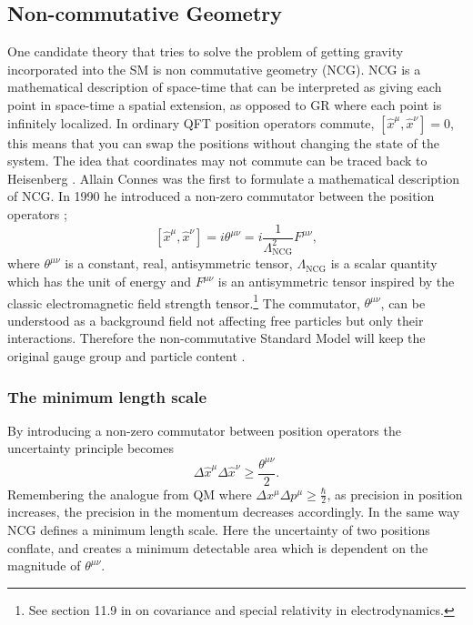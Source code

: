 \subsection{Non-commutative Geometry}
One candidate theory that tries to solve the problem of getting gravity incorporated into the SM is non commutative geometry (NCG). NCG is a mathematical description of space-time that can be interpreted as giving each point in space-time a spatial extension, as opposed to GR where each point is infinitely localized. In ordinary QFT position operators commute, $[ \hat x^{\mu}, \hat x^{\nu}] = 0$, this means that you can swap the positions without changing the state of the system. The idea that coordinates may not commute can be traced back to Heisenberg \cite{snyder1947qst}. Allain Connes \cite{connes1991pma} was the first to formulate a mathematical description of NCG. In 1990 he introduced a non-zero commutator between the position operators \cite{rosendahl2008};
\begin{equation} \label{eq:ncgtheta}
	[ \hat x^{\mu}, \hat x^{\nu}] = i \theta^{\mu \nu} = i \frac{1}{\Lambda_{\textrm{NCG}}^2} F^{\mu\nu},
\end{equation}
where $\theta^{\mu \nu}$ is a constant, real, antisymmetric tensor, $\Lambda_{\textrm{NCG}}$ is a scalar quantity which has the unit of energy and $F^{\mu\nu}$ is an antisymmetric tensor inspired by the classic electromagnetic field strength tensor.\footnote{See section 11.9 in \cite{jackson1975cew} on covariance and special relativity in electrodynamics.} The commutator, $\theta^{\mu \nu}$, can be understood as a background field not affecting free particles but only their interactions. Therefore the non-commutative Standard Model will keep the original gauge group and particle content \cite{rosendahl2008}.

\subsubsection{The minimum length scale}
By introducing a non-zero commutator between position operators the uncertainty principle becomes
\begin{equation}
\Delta \hat x^{\mu} \Delta \hat x^{\nu} \ge \frac{\theta^{\mu \nu}}{2}.
\end{equation}
Remembering the analogue from QM where $\Delta x^{\mu} \Delta p^{\mu} \ge \frac{\hbar}{2}$, as precision in position increases, the precision in the momentum decreases accordingly. In the same way NCG defines a minimum length scale. Here the uncertainty of two positions conflate, and creates a minimum detectable area which is dependent on the magnitude of $\theta^{\mu \nu}$.

